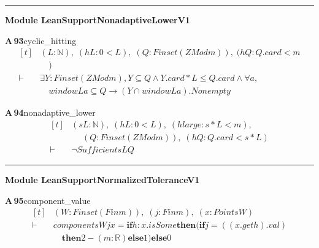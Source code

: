 \documentclass[conference]{IEEEtran}
\theoremstyle{definition}
\newcommand{\lean}[1]{\textsf{\footnotesize #1}}
\begin{document}
\vspace{4pt}\noindent\rule{\columnwidth}{0.4pt}\par\vspace{2pt}
\noindent\textbf{Module \lean{LeanSupportNonadaptiveLowerV1}}\par\vspace{3pt}

\noindent\textbf{A\,93}\quad\lean{cyclic\_hitting}
{\footnotesize\[ \begin{aligned}[t]
&(\mathit{L} : \mathbb{N} ),\; (\mathit{hL} : 0<\mathit{L}),\; (\mathit{Q} : \mathit{Finset} (\mathit{ZMod} \mathit{m})),\; (\mathit{hQ} : \mathit{Q}.\mathit{card}< \mathit{m}\\
&\quad )\\
\vdash\;&\exists \mathit{Y} : \mathit{Finset} (\mathit{ZMod} \mathit{m}),\mathit{Y} \subseteq \mathit{Q} \wedge \mathit{Y}.\mathit{card}*\mathit{L} \leq \mathit{Q}.\mathit{card} \wedge \forall \mathit{a},\\
&\quad \mathit{window} \mathit{L} \mathit{a} \subseteq \mathit{Q} \to (\mathit{Y} \cap \mathit{window} \mathit{L} \mathit{a}).\mathit{Nonempty}
\end{aligned} \]}

\noindent\textbf{A\,94}\quad\lean{nonadaptive\_lower}
{\footnotesize\[ \begin{aligned}[t]
&(\mathit{s} \mathit{L} : \mathbb{N} ),\; (\mathit{hL} : 0<\mathit{L}),\; (\mathit{hlarge} : \mathit{s}*\mathit{L}< \mathit{m}),\\
&\quad \; (\mathit{Q} : \mathit{Finset} (\mathit{ZMod} \mathit{m})),\; (\mathit{hQ} : \mathit{Q}.\mathit{card}<\mathit{s}*\mathit{L})\\
\vdash\;&\neg \mathit{Sufficient} \mathit{s} \mathit{L} \mathit{Q}
\end{aligned} \]}

\vspace{4pt}\noindent\rule{\columnwidth}{0.4pt}\par\vspace{2pt}
\noindent\textbf{Module \lean{LeanSupportNormalizedToleranceV1}}\par\vspace{3pt}

\noindent\textbf{A\,95}\quad\lean{component\_value}
{\footnotesize\[ \begin{aligned}[t]
&(\mathit{W} : \mathit{Finset} (\mathit{Fin} \mathit{m})),\; (\mathit{j} : \mathit{Fin} \mathit{m}),\; (\mathit{x} : \mathit{Points} \mathit{W})\\
\vdash\;&\mathit{components} \mathit{W} \mathit{j} \mathit{x} = \mathbf{if} \mathit{h} : \mathit{x}.\mathit{isSome} \mathbf{then} (\mathbf{if} \mathit{j} = ((\mathit{x}.\mathit{get} \mathit{h}).\mathit{val})\\
&\quad \mathbf{then} 2-(\mathit{m}:\mathbb{R} ) \mathbf{else} 1) \mathbf{else} 0
\end{aligned} \]}
\end{document}
